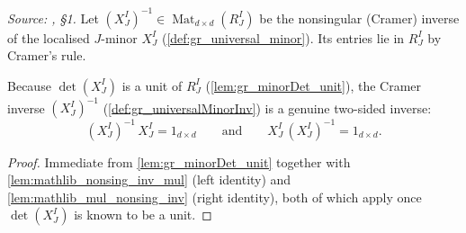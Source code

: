 \begin{definition}\leanok
  \label{def:gr_universalMinorInv}
  \textit{Source: \cite{nitsure-hilbert-quot}, \S 1.}
  Let \((X^I_J)^{-1} \in \operatorname{Mat}_{d \times d}(R^I_J)\) be the
  nonsingular (Cramer) inverse of the localised \(J\)-minor \(X^I_J\)
  (\cref{def:gr_universal_minor}). Its entries lie in \(R^I_J\) by Cramer's rule.
\end{definition}

\begin{lemma}\leanok
  \label{lem:gr_universalMinorInv_identities}
  Because \(\det(X^I_J)\) is a unit of \(R^I_J\) (\cref{lem:gr_minorDet_unit}),
  the Cramer inverse \((X^I_J)^{-1}\) (\cref{def:gr_universalMinorInv}) is a
  genuine two-sided inverse:
  \[
    (X^I_J)^{-1}\, X^I_J = 1_{d\times d}
    \qquad\text{and}\qquad
    X^I_J\, (X^I_J)^{-1} = 1_{d\times d}.
  \]
\end{lemma}
\begin{proof}
  \leanok
  Immediate from \cref{lem:gr_minorDet_unit} together with
  \cref{lem:mathlib_nonsing_inv_mul} (left identity) and
  \cref{lem:mathlib_mul_nonsing_inv} (right identity), both of which apply once
  \(\det(X^I_J)\) is known to be a unit.
\end{proof}

